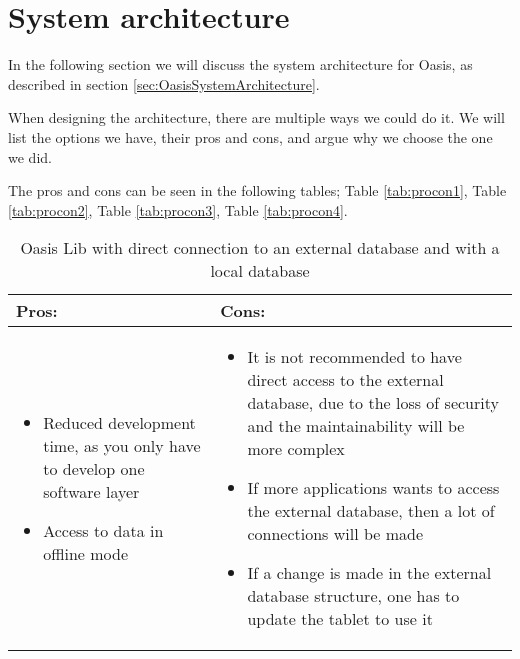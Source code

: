 \section{System architecture}
In the following section we will discuss the system architecture for Oasis, as described in section \vref{sec:OasisSystemArchitecture}.

When designing the architecture, there are multiple ways we could do it. We will list the options we have, their pros and cons, and argue why we choose the one we did.

The pros and cons can be seen in the following tables; Table \vref{tab:procon1}, Table \vref{tab:procon2}, Table \vref{tab:procon3}, Table \vref{tab:procon4}.

\begin{table}[htbp]
	\centering
		\begin{tabular}{| p{6cm} | m{6cm} |}
			\hline
			\textbf{Pros:} & \textbf{Cons:} \\ \hline
\begin{itemize}
	\item Reduced development time, as you only have to develop one software layer
	\item Access to data in offline mode
\end{itemize}
&
\begin{itemize}
	\item It is not recommended to have direct access to the external database, due to the loss of security and the maintainability will be more complex
	\item If more applications wants to access the external database, then a lot of connections will be made
	\item If a change is made in the external database structure, one has to update the tablet to use it
\end{itemize}
\\ \hline
		\end{tabular}
	\caption{Oasis Lib with direct connection to an external database and with a local database}
	\label{tab:procon1}
\end{table}


